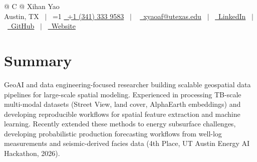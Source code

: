 \documentclass[a4paper,12pt]{article}
\providecommand{\PrivateBuild}{0}
\begin{document}
\pagestyle{empty}

\begin{tabularx}{\linewidth}{@{} C @{}}
{\Huge Xihan Yao \quad {\Large }} \\[6pt]

Austin, TX \ $|$ \
\ifnum\PrivateBuild=1
\href{tel:+13413339583}{\raisebox{-0.05\height}\faMobile\ +1 (341) 333 9583} \ $|$ \
\fi
\href{mailto:xyaoaf@utexas.edu}{\raisebox{-0.05\height}\faEnvelope\ xyaoaf@utexas.edu} \ $|$ \
\href{https://www.linkedin.com/in/xihan-yao-6381b3181/}{\raisebox{-0.05\height}\faLinkedin\ LinkedIn} \ $|$ \
\href{https://github.com/xyaoaf}{\raisebox{-0.05\height}\faGithub\ GitHub} \ $|$ \
\href{https://xyaoaf.github.io/}{\raisebox{-0.05\height}\faGlobe\ Website}

\end{tabularx}



\section{Summary}
GeoAI and data engineering-focused researcher building scalable geospatial data pipelines for large-scale spatial modeling. Experienced in processing TB-scale multi-modal datasets (Street View, land cover, AlphaEarth embeddings) and developing reproducible workflows for spatial feature extraction and machine learning. Recently extended these methods to energy subsurface challenges, developing probabilistic production forecasting workflows from well-log measurements and seismic-derived facies data (4th Place, UT Austin Energy AI Hackathon, 2026).

\end{document}
